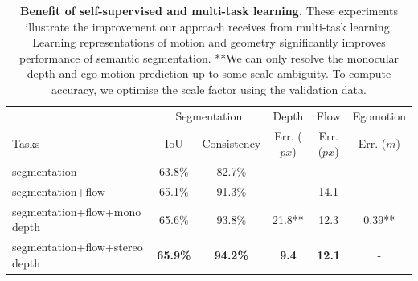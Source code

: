 \begin{table}[t]
\begin{center}
	\begin{tabular}{l|c|c|c|c|c}
    \hline
    & \multicolumn{2}{c|}{Segmentation} & Depth & Flow & Egomotion\\
    Tasks & IoU & Consistency & Err. ($px$) & Err. ($px$)& Err. ($m$) \\
    \hline\hline
    segmentation & 63.8\% & 82.7\% & - & - & - \\
    segmentation+flow & 65.1\% &91.3\% & - & 14.1 & - \\
    segmentation+flow+mono depth & 65.6\% & 93.8\% & 21.8** & 12.3 & 0.39** \\
    segmentation+flow+stereo depth & \textbf{65.9\%} & \textbf{94.2\%} & \textbf{9.4} & \textbf{12.1} & - \\
    \hline
	\end{tabular}
\end{center}
\vspace{-2mm}
\caption[Benefit of self-supervised and multi-task learning.]{\textbf{Benefit of self-supervised and multi-task learning.} These experiments illustrate the improvement our approach receives from multi-task learning. Learning representations of motion and geometry significantly improves performance of semantic segmentation. **We can only resolve the monocular depth and ego-motion prediction up to some scale-ambiguity. To compute accuracy, we optimise the scale factor using the validation data.}
\label{tbl:multitask}
\vspace{-5mm}
\end{table}

